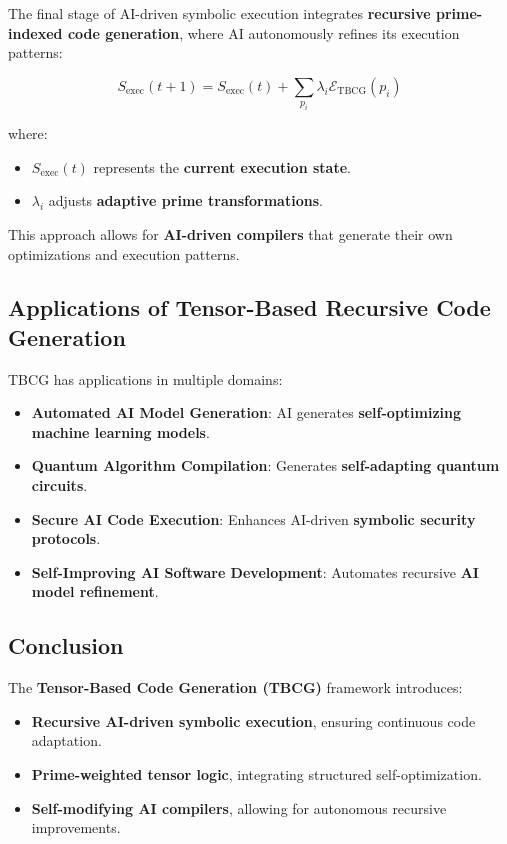 \documentclass{article}
\theoremstyle{plain}
\theoremstyle{plain}
\theoremstyle{definition}
\theoremstyle{remark}
\begin{document}
The final stage of AI-driven symbolic execution integrates \textbf{recursive prime-indexed code generation}, where AI autonomously refines its execution patterns:

\begin{equation}
S_{\text{exec}}(t+1) = S_{\text{exec}}(t) + \sum_{p_i} \lambda_i \mathcal{E}_{\text{TBCG}}(p_i)
\end{equation}

where:
\begin{itemize}
    \item $S_{\text{exec}}(t)$ represents the \textbf{current execution state}.
    \item $\lambda_i$ adjusts \textbf{adaptive prime transformations}.
\end{itemize}

This approach allows for \textbf{AI-driven compilers} that generate their own optimizations and execution patterns.

\subsection{Applications of Tensor-Based Recursive Code Generation}

TBCG has applications in multiple domains:
\begin{itemize}
    \item \textbf{Automated AI Model Generation}: AI generates \textbf{self-optimizing machine learning models}.
    \item \textbf{Quantum Algorithm Compilation}: Generates \textbf{self-adapting quantum circuits}.
    \item \textbf{Secure AI Code Execution}: Enhances AI-driven \textbf{symbolic security protocols}.
    \item \textbf{Self-Improving AI Software Development}: Automates recursive \textbf{AI model refinement}.
\end{itemize}

\subsection{Conclusion}

The \textbf{Tensor-Based Code Generation (TBCG)} framework introduces:
\begin{itemize}
    \item \textbf{Recursive AI-driven symbolic execution}, ensuring continuous code adaptation.
    \item \textbf{Prime-weighted tensor logic}, integrating structured self-optimization.
    \item \textbf{Self-modifying AI compilers}, allowing for autonomous recursive improvements.
\end{itemize}
\end{document}
